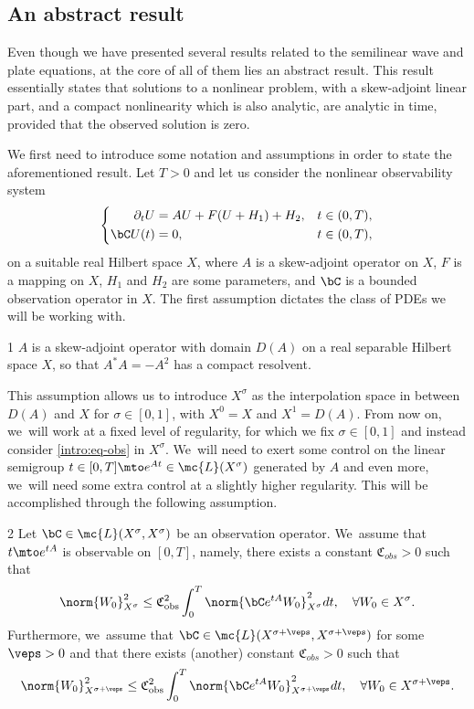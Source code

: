 \subsection{An abstract result}\label{s:abstrIntro} Even though we have presented several results related to the semilinear wave and plate equations, at the core of all of them lies an abstract result. This result essentially states that solutions to a nonlinear problem, with a skew-adjoint linear part, and a compact nonlinearity which is also analytic, are analytic in time, provided that the observed solution is zero.

We first need to introduce some notation and assumptions in order to state the aforementioned result. Let $T>0$ and let us consider the nonlinear observability system
\begin{align}\label{intro:eq-obs}
\left\{\begin{aligned}
\partial_t U&=AU+F(U+H_1)+H_2, &t&\in (0, T), \\
\bC U(t)&=0, &t&\in (0, T),
\end{aligned}\right.
\end{align}
on a suitable real Hilbert space $X$, where $A$ is a skew-adjoint operator on $X$, $F$ is a mapping on $X$, $H_1$ and $H_2$ are some parameters, and $\bC$ is a bounded observation operator in $X$. The first assumption dictates the class of PDEs we will be working with.
\begin{assump}{1}
\label{assumAA}$A$ is a skew-adjoint operator with domain $D(A)$ on a real separable Hilbert space $X$, so that $A^*A=-A^2$ has a compact resolvent.
\end{assump}
This assumption allows us to introduce $X^\sigma$ as the interpolation space in between $D(A)$ and $X$ for $\sigma\in [0, 1]$, with $X^0=X$ and $X^1=D(A)$. From now on, we~will work at a fixed level of regularity, for which we fix $\sigma\in [0, 1]$ and instead consider \eqref{intro:eq-obs} in $X^\sigma$. We~will need to exert some control on the linear semigroup $t\in [0, T]\mto e^{At}\in \mc{L}(X^\sigma)$ generated by $A$ and even more, we~will need some extra control at a slightly higher regularity. This will be accomplished through the following assumption.

\begin{assump}{2}
\label{assumCC}Let $\bC\in\mc{L}(X^\sigma, X^\sigma)$ be an observation operator. We~assume that $t\mto e^{tA}$ is observable on $[0,T]$, namely, there exists a constant $\mathfrak{C}_{obs}>0$ such that
\begin{align}\label{observabstractintro}
\norm{W_0}_{X^\sigma}^2\leq \mathfrak{C}_{\textup{obs}}^2\int_0^T \norm{\bC e^{tA}W_0}_{X^\sigma}^2dt,\quad \forall W_0\in X^\sigma.
\end{align}
Furthermore, we~assume that $\bC\in\mc{L}(X^{\sigma+\veps}, X^{\sigma+\veps})$ for some $\veps>0$ and that there exists (another) constant $\mathfrak{C}_{obs}>0$ such that
\begin{align}\label{observabstractvepsintro}
\norm{W_0}_{X^{\sigma+\veps}}^2\leq \mathfrak{C}_{\textup{obs}}^2\int_0^T \norm{\bC e^{tA}W_0}_{X^{\sigma+\veps}}^2dt,\quad \forall W_0\in X^{\sigma+\veps}.
\end{align}
\end{assump}


